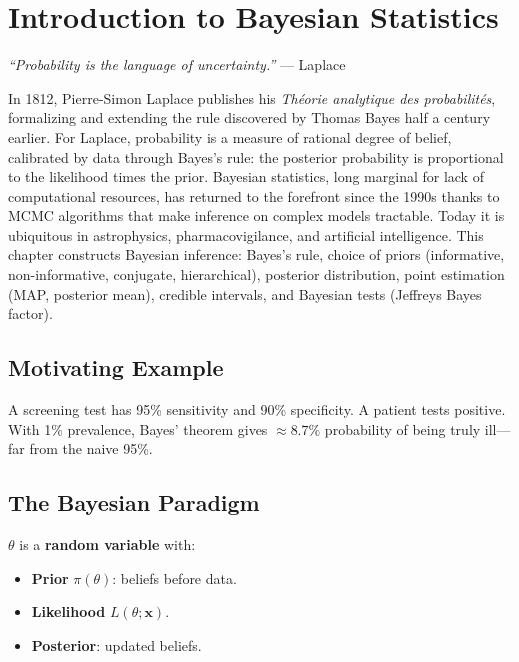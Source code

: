 \chapter{Introduction to Bayesian Statistics}
\label{ch:bayesian}

\begin{center}
\textit{``Probability is the language of uncertainty.''} --- Laplace
\end{center}

In 1812, Pierre-Simon Laplace publishes his \emph{Théorie analytique des probabilités}, formalizing and extending the rule discovered by Thomas Bayes half a century earlier. For Laplace, probability is a measure of rational degree of belief, calibrated by data through Bayes's rule: the posterior probability is proportional to the likelihood times the prior. Bayesian statistics, long marginal for lack of computational resources, has returned to the forefront since the 1990s thanks to MCMC algorithms that make inference on complex models tractable. Today it is ubiquitous in astrophysics, pharmacovigilance, and artificial intelligence. This chapter constructs Bayesian inference: Bayes's rule, choice of priors (informative, non-informative, conjugate, hierarchical), posterior distribution, point estimation (MAP, posterior mean), credible intervals, and Bayesian tests (Jeffreys Bayes factor).

\section{Motivating Example}
A screening test has 95\% sensitivity and 90\% specificity. A patient tests positive. With 1\% prevalence, Bayes' theorem gives $\approx 8.7\%$ probability of being truly ill---far from the naive 95\%.

\section{The Bayesian Paradigm}

\begin{definition}
$\theta$ is a \textbf{random variable} with:
\begin{itemize}
\item \textbf{Prior} $\pi(\theta)$: beliefs before data.
\item \textbf{Likelihood} $L(\theta;\mathbf{x})$.
\item \textbf{Posterior}: updated beliefs.
\end{itemize}
\end{definition}

